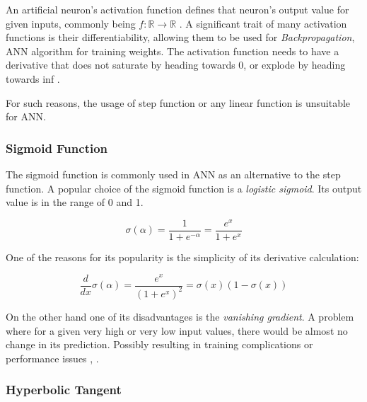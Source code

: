 An artificial neuron's activation function defines that neuron's output value for given inputs, commonly being ${f: \mathbb{R} \rightarrow \mathbb{R}}$ \cite{leskovec2020mining}. A significant trait of many activation functions is their differentiability, allowing them to be used for \textit{Backpropagation}, ANN algorithm for training weights. The activation function needs to have a derivative that does not saturate by heading towards 0, or explode by heading towards inf \cite{matous}.

For such reasons, the usage of step function or any linear function is unsuitable for ANN.
\subsubsection{Sigmoid Function}
The sigmoid function is commonly used in ANN as an alternative to the step function. A popular choice of the sigmoid function is a \textit{logistic sigmoid}. Its output value is in the range of 0 and 1.

\begin{equation}
    {\sigma(\alpha) = \frac{1}{1 + e^{-\alpha}} = \frac{e^x}{1 + e^{x}}}
\end{equation}




One of the reasons for its popularity is the simplicity of its derivative calculation:

\begin{equation}
    {\frac{d}{dx}\sigma(\alpha) = \frac{e^x}{(1 + e^{x})^2} = \sigma(x)(1-\sigma(x))}
\end{equation}


On the other hand one of its disadvantages is the \textit{vanishing gradient}. A problem where for a given very high or very low input values, there would be almost no change in its prediction. Possibly resulting in training complications or performance issues \cite{7typesactivationfunctions}, \cite{matous}.


\subsubsection{Hyperbolic Tangent}

